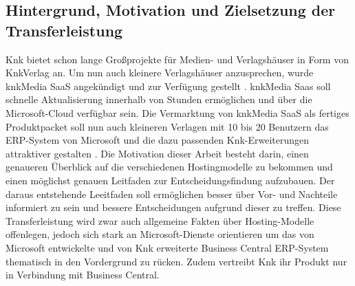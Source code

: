 \documentclass[12pt,bibtotoc]{article}
\begin{document}
	\subsection{Hintergrund, Motivation und Zielsetzung der Transferleistung}
	Knk bietet schon lange Großprojekte für Medien- und Verlagshäuser in Form von KnkVerlag an. 
	Um nun auch kleinere Verlagshäuser anzusprechen, wurde knkMedia SaaS angekündigt und zur Verfügung gestellt \cite{knk-kuendigtSaaS-an.2023}.
	\newline
	knkMedia Saas soll schnelle Aktualisierung innerhalb von Stunden ermöglichen und über die Microsoft-Cloud verfügbar sein.
	Die Vermarktung von knkMedia SaaS als fertiges Produktpacket soll nun auch kleineren Verlagen mit 10 bis 20 Benutzern das ERP-System von Microsoft und die dazu passenden Knk-Erweiterungen attraktiver gestalten \cite{knk-kuendigtSaaS-an.2023}.
	\newline
	Die Motivation dieser Arbeit besteht darin, einen genaueren Überblick auf die verschiedenen Hostingmodelle zu bekommen und einen möglichst genauen Leitfaden zur Entscheidungsfindung aufzubauen.
	Der daraus entstehende Leeitfaden soll ermöglichen besser über Vor- und Nachteile informiert zu sein und bessere Entscheidungen aufgrund dieser zu treffen. 
	\newline
	Diese Transferleistung wird zwar auch allgemeine Fakten über Hosting-Modelle offenlegen, jedoch sich stark an Microsoft-Dienste orientieren um das von Microsoft entwickelte und von Knk erweiterte Business Central ERP-System 
	thematisch in den Vordergrund zu rücken. Zudem vertreibt Knk ihr Produkt nur in Verbindung mit Business Central.


\end{document}
